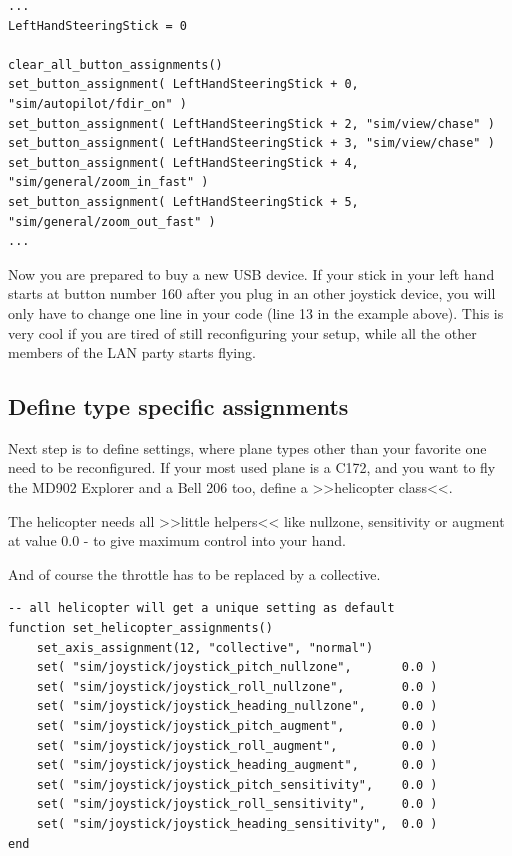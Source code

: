 \documentclass[11pt,parskip=half,a4paper]{scrartcl}
\begin{document}
\begin{lstlisting}[firstnumber=12]
...
LeftHandSteeringStick = 0

clear_all_button_assignments()
set_button_assignment( LeftHandSteeringStick + 0, "sim/autopilot/fdir_on" )
set_button_assignment( LeftHandSteeringStick + 2, "sim/view/chase" )
set_button_assignment( LeftHandSteeringStick + 3, "sim/view/chase" )
set_button_assignment( LeftHandSteeringStick + 4, "sim/general/zoom_in_fast" )
set_button_assignment( LeftHandSteeringStick + 5, "sim/general/zoom_out_fast" )
...
\end{lstlisting}

Now you are prepared to buy a new USB device. If your stick in your left hand starts at button number 160 after you plug in an other joystick device, you will only have to change one line in your code (line 13 in the example above). This is very cool if you are tired of still reconfiguring your setup, while all the other members of the LAN party starts flying.

\subsection{Define type specific assignments}

Next step is to define settings, where plane types other than your favorite one need to be reconfigured. If your most used plane is a C172, and you want to fly the MD902 Explorer and a Bell 206 too, define a >>helicopter class<<.

The helicopter needs all >>little helpers<< like nullzone, sensitivity or augment at value 0.0 - to give maximum control into your hand.

And of course the throttle has to be replaced by a collective.

\begin{lstlisting}[firstnumber=134]
-- all helicopter will get a unique setting as default
function set_helicopter_assignments()
    set_axis_assignment(12, "collective", "normal")
    set( "sim/joystick/joystick_pitch_nullzone",       0.0 )
    set( "sim/joystick/joystick_roll_nullzone",        0.0 )
    set( "sim/joystick/joystick_heading_nullzone",     0.0 )
    set( "sim/joystick/joystick_pitch_augment",        0.0 )
    set( "sim/joystick/joystick_roll_augment",         0.0 )
    set( "sim/joystick/joystick_heading_augment",      0.0 )
    set( "sim/joystick/joystick_pitch_sensitivity",    0.0 )
    set( "sim/joystick/joystick_roll_sensitivity",     0.0 )
    set( "sim/joystick/joystick_heading_sensitivity",  0.0 )
end
\end{lstlisting}
\end{document}
